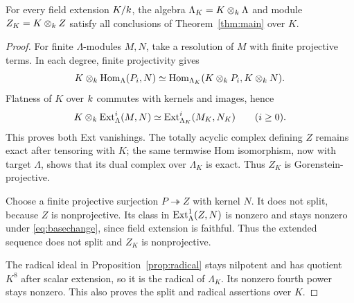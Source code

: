 \begin{proposition}\label{prop:basechange}
For every field extension $K/k$, the algebra
$\Lambda_K=K\otimes_k\Lambda$ and module $Z_K=K\otimes_k Z$
satisfy all conclusions of Theorem~\ref{thm:main} over $K$.
\end{proposition}\nopagebreak
\begin{proof}
For finite $\Lambda$-modules $M,N$, take a resolution of $M$ with
finite projective terms. In each degree, finite projectivity gives
\[
 K\otimes_k\operatorname{Hom}_\Lambda(P_i,N)
 \simeq\operatorname{Hom}_{\Lambda_K}(K\otimes_k P_i,K\otimes_k N).
\]
Flatness of $K$ over $k$ commutes with kernels and images, hence
\begin{equation}\label{eq:basechange}
 K\otimes_k\operatorname{Ext}_\Lambda^i(M,N)
 \simeq\operatorname{Ext}_{\Lambda_K}^i(M_K,N_K)\qquad(i\geq0).
\end{equation}
This proves both Ext vanishings. The totally acyclic complex defining
$Z$ remains exact after tensoring with $K$; the same termwise Hom
isomorphism, now with target $\Lambda$, shows that its dual complex
over $\Lambda_K$ is exact. Thus $Z_K$ is Gorenstein-projective.

Choose a finite projective surjection $P\twoheadrightarrow Z$ with
kernel $N$. It does not split, because $Z$ is nonprojective. Its class
in $\operatorname{Ext}_\Lambda^1(Z,N)$ is nonzero and stays nonzero under
\eqref{eq:basechange}, since field extension is faithful. Thus the
extended sequence does not split and $Z_K$ is nonprojective.

The radical ideal in Proposition~\ref{prop:radical} stays nilpotent
and has quotient $K^8$ after scalar extension, so it is the radical of
$\Lambda_K$. Its nonzero fourth power stays nonzero. This also proves
the split and radical assertions over $K$.
\end{proof}
